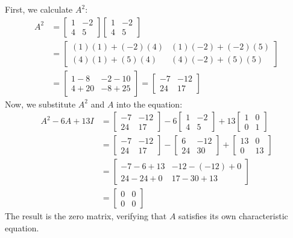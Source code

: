 \documentclass{article}
\begin{document}
First, we calculate $A^2$:
\begin{align*}
	A^2 & = \begin{bmatrix} 1 & -2 \\ 4 & 5 \end{bmatrix} \begin{bmatrix} 1 & -2 \\ 4 & 5 \end{bmatrix} \\
	    & = \begin{bmatrix}
		        (1)(1) + (-2)(4) & (1)(-2) + (-2)(5) \\
		        (4)(1) + (5)(4)  & (4)(-2) + (5)(5)
	        \end{bmatrix}                                                        \\
	    & = \begin{bmatrix}
		        1 - 8  & -2 - 10 \\
		        4 + 20 & -8 + 25
	        \end{bmatrix}
	= \begin{bmatrix} -7 & -12 \\ 24 & 17 \end{bmatrix}
\end{align*}
Now, we substitute $A^2$ and $A$ into the equation:
\begin{align*}
	A^2 - 6A + 13I & = \begin{bmatrix} -7 & -12 \\ 24 & 17 \end{bmatrix} - 6\begin{bmatrix} 1 & -2 \\ 4 & 5 \end{bmatrix} + 13\begin{bmatrix} 1 & 0 \\ 0 & 1 \end{bmatrix}   \\
	               & = \begin{bmatrix} -7 & -12 \\ 24 & 17 \end{bmatrix} - \begin{bmatrix} 6 & -12 \\ 24 & 30 \end{bmatrix} + \begin{bmatrix} 13 & 0 \\ 0 & 13 \end{bmatrix} \\
	               & = \begin{bmatrix}
		                   -7 - 6 + 13 & -12 - (-12) + 0 \\
		                   24 - 24 + 0 & 17 - 30 + 13
	                   \end{bmatrix}                                                                                                                         \\
	               & = \begin{bmatrix} 0 & 0 \\ 0 & 0 \end{bmatrix}
\end{align*}
The result is the zero matrix, verifying that $A$ satisfies its own characteristic equation.
\end{document}

